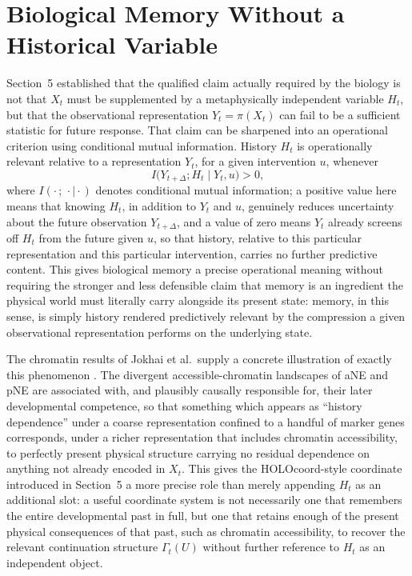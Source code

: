 \documentclass[11pt]{article}
\begin{document}
\section{Biological Memory Without a Historical Variable}

Section~5 established that the qualified claim actually required by the biology is not that $X_t$ must be supplemented by a metaphysically independent variable $H_t$, but that the observational representation $Y_t = \pi(X_t)$ can fail to be a sufficient statistic for future response. That claim can be sharpened into an operational criterion using conditional mutual information. History $H_t$ is operationally relevant relative to a representation $Y_t$, for a given intervention $u$, whenever
\begin{equation}
I\bigl(Y_{t+\Delta} ; H_t \mid Y_t, u\bigr) > 0,
\end{equation}
where $I(\cdot\,;\,\cdot\mid\cdot)$ denotes conditional mutual information; a positive value here means that knowing $H_t$, in addition to $Y_t$ and $u$, genuinely reduces uncertainty about the future observation $Y_{t+\Delta}$, and a value of zero means $Y_t$ already screens off $H_t$ from the future given $u$, so that history, relative to this particular representation and this particular intervention, carries no further predictive content. This gives biological memory a precise operational meaning without requiring the stronger and less defensible claim that memory is an ingredient the physical world must literally carry alongside its present state: memory, in this sense, is simply history rendered predictively relevant by the compression a given observational representation performs on the underlying state.

The chromatin results of Jokhai et al.\ supply a concrete illustration of exactly this phenomenon \cite{jokhai2026}. The divergent accessible-chromatin landscapes of aNE and pNE are associated with, and plausibly causally responsible for, their later developmental competence, so that something which appears as ``history dependence'' under a coarse representation confined to a handful of marker genes corresponds, under a richer representation that includes chromatin accessibility, to perfectly present physical structure carrying no residual dependence on anything not already encoded in $X_t$. This gives the HOLOcoord-style coordinate introduced in Section~5 a more precise role than merely appending $H_t$ as an additional slot: a useful coordinate system is not necessarily one that remembers the entire developmental past in full, but one that retains enough of the present physical consequences of that past, such as chromatin accessibility, to recover the relevant continuation structure $\Gamma_t(U)$ without further reference to $H_t$ as an independent object.
\end{document}
